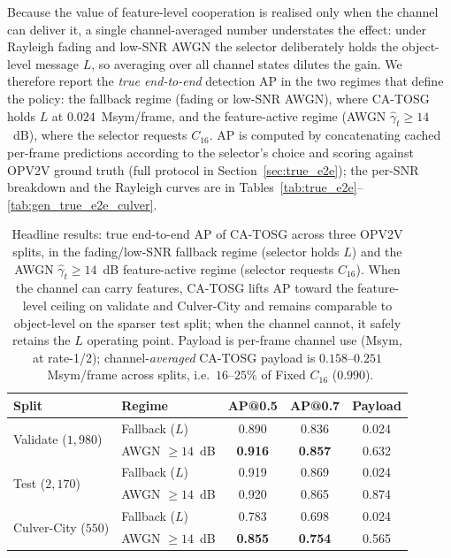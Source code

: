 \documentclass[journal]{IEEEtran}
\newcommand{\method}{CA-TOSG}
\begin{document}
Because the value of feature-level cooperation is realised only when the channel can deliver it, a single channel-averaged number understates the effect: under Rayleigh fading and low-SNR AWGN the selector deliberately holds the object-level message $L$, so averaging over all channel states dilutes the gain. We therefore report the \emph{true end-to-end} detection AP in the two regimes that define the policy: the fallback regime (fading or low-SNR AWGN), where \method{} holds $L$ at $0.024$~Msym/frame, and the feature-active regime (AWGN $\hat\gamma_t \ge 14$~dB), where the selector requests $C_{16}$. AP is computed by concatenating cached per-frame predictions according to the selector's choice and scoring against OPV2V ground truth (full protocol in Section~\ref{sec:true_e2e}); the per-SNR breakdown and the Rayleigh curves are in Tables~\ref{tab:true_e2e}--\ref{tab:gen_true_e2e_culver}.

\begin{table}[t]
\centering
\caption{Headline results: true end-to-end AP of \method{} across three OPV2V splits, in the fading/low-SNR fallback regime (selector holds $L$) and the AWGN $\hat\gamma_t\ge14$~dB feature-active regime (selector requests $C_{16}$). When the channel can carry features, \method{} lifts AP toward the feature-level ceiling on validate and Culver-City and remains comparable to object-level on the sparser test split; when the channel cannot, it safely retains the $L$ operating point. Payload is per-frame channel use (Msym, at rate-1/2); channel-\emph{averaged} \method{} payload is $0.158$--$0.251$~Msym/frame across splits, i.e.\ $16$--$25\%$ of Fixed $C_{16}$ ($0.990$).}
\label{tab:headline}
\begin{tabular}{llccc}
\toprule
Split & Regime & AP@0.5 & AP@0.7 & Payload \\
\midrule
\multirow{2}{*}{Validate ($1{,}980$)}
  & Fallback ($L$)  & 0.890 & 0.836 & 0.024 \\
  & AWGN $\ge14$~dB & \textbf{0.916} & \textbf{0.857} & 0.632 \\
\midrule
\multirow{2}{*}{Test ($2{,}170$)}
  & Fallback ($L$)  & 0.919 & 0.869 & 0.024 \\
  & AWGN $\ge14$~dB & 0.920 & 0.865 & 0.874 \\
\midrule
\multirow{2}{*}{Culver-City ($550$)}
  & Fallback ($L$)  & 0.783 & 0.698 & 0.024 \\
  & AWGN $\ge14$~dB & \textbf{0.855} & \textbf{0.754} & 0.565 \\
\bottomrule
\end{tabular}
\end{table}
\end{document}
